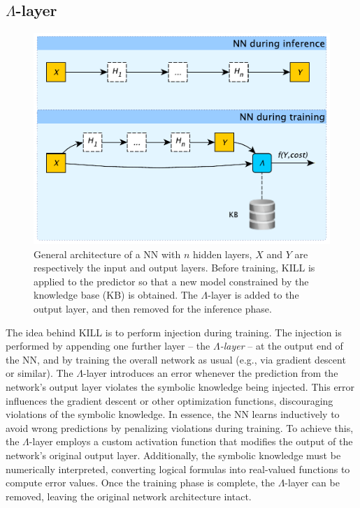 \subsection{$\Lambda$-layer}\label{subsec:lambda-layer}
%
\begin{figure}
    \centering
    \includegraphics[width=0.8\linewidth]{figures/lambda-layer}
    \caption[General architecture of a NN with $\Lambda$-layer]{
        General architecture of a \gls{NN} with $n$ hidden layers, $X$ and $Y$ are respectively the input and output layers.
        Before training, \gls{KILL} is applied to the predictor so that a new model constrained by the knowledge base (KB) is obtained.
        The $\Lambda$-layer is added to the output layer, and then removed for the inference phase.
    }
    \label{fig:lambda-layer}
\end{figure}
%
The idea behind \gls{KILL} is to perform injection during training.
%
The injection is performed by appending one further layer -- the \emph{$\Lambda$-layer} -- at the output end of the \gls{NN}, and by training the overall network as usual (e.g., via gradient descent or similar).
%
The $\Lambda$-layer introduces an error whenever the prediction from the network's output layer violates the symbolic knowledge being injected.
%
This error influences the gradient descent or other optimization functions, discouraging violations of the symbolic knowledge.
%
In essence, the \gls{NN} learns inductively to avoid wrong predictions by penalizing violations during training.
%
To achieve this, the $\Lambda$-layer employs a custom activation function that modifies the output of the network's original output layer.
%
Additionally, the symbolic knowledge must be numerically interpreted, converting logical formulas into real-valued functions to compute error values.
%
Once the training phase is complete, the $\Lambda$-layer can be removed, leaving the original network architecture intact.


